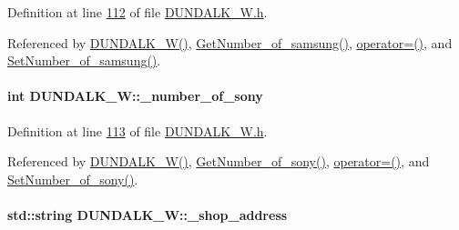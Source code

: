 Definition at line \hyperlink{_d_u_n_d_a_l_k___w_8h_source_l00112}{112} of file \hyperlink{_d_u_n_d_a_l_k___w_8h_source}{D\+U\+N\+D\+A\+L\+K\+\_\+\+W.\+h}.



Referenced by \hyperlink{_d_u_n_d_a_l_k___w_8h_source_l00024}{D\+U\+N\+D\+A\+L\+K\+\_\+\+W()}, \hyperlink{_d_u_n_d_a_l_k___w_8cpp_source_l00105}{Get\+Number\+\_\+of\+\_\+samsung()}, \hyperlink{_d_u_n_d_a_l_k___w_8h_source_l00075}{operator=()}, and \hyperlink{_d_u_n_d_a_l_k___w_8cpp_source_l00101}{Set\+Number\+\_\+of\+\_\+samsung()}.

\paragraph[{\texorpdfstring{\+\_\+number\+\_\+of\+\_\+sony}{_number_of_sony}}]{\setlength{\rightskip}{0pt plus 5cm}int D\+U\+N\+D\+A\+L\+K\+\_\+\+W\+::\+\_\+number\+\_\+of\+\_\+sony\hspace{0.3cm}{\ttfamily [private]}}\hypertarget{class_d_u_n_d_a_l_k___w_a9a40b513a6d4153a9a0f37ce47429369_a9a40b513a6d4153a9a0f37ce47429369}{}\label{class_d_u_n_d_a_l_k___w_a9a40b513a6d4153a9a0f37ce47429369_a9a40b513a6d4153a9a0f37ce47429369}


Definition at line \hyperlink{_d_u_n_d_a_l_k___w_8h_source_l00113}{113} of file \hyperlink{_d_u_n_d_a_l_k___w_8h_source}{D\+U\+N\+D\+A\+L\+K\+\_\+\+W.\+h}.



Referenced by \hyperlink{_d_u_n_d_a_l_k___w_8h_source_l00024}{D\+U\+N\+D\+A\+L\+K\+\_\+\+W()}, \hyperlink{_d_u_n_d_a_l_k___w_8cpp_source_l00097}{Get\+Number\+\_\+of\+\_\+sony()}, \hyperlink{_d_u_n_d_a_l_k___w_8h_source_l00075}{operator=()}, and \hyperlink{_d_u_n_d_a_l_k___w_8cpp_source_l00093}{Set\+Number\+\_\+of\+\_\+sony()}.

\paragraph[{\texorpdfstring{\+\_\+shop\+\_\+address}{_shop_address}}]{\setlength{\rightskip}{0pt plus 5cm}std\+::string D\+U\+N\+D\+A\+L\+K\+\_\+\+W\+::\+\_\+shop\+\_\+address\hspace{0.3cm}{\ttfamily [private]}}\hypertarget{class_d_u_n_d_a_l_k___w_a84ef96f22ec520afc66bb26b0d264475_a84ef96f22ec520afc66bb26b0d264475}{}\label{class_d_u_n_d_a_l_k___w_a84ef96f22ec520afc66bb26b0d264475_a84ef96f22ec520afc66bb26b0d264475}


